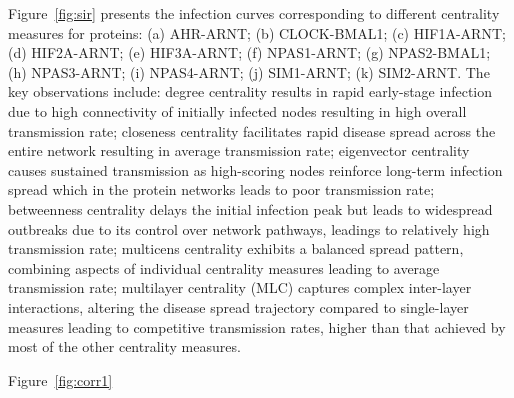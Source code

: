 \documentclass[10pt,letterpaper]{article}
\begin{document}
Figure~\ref{fig:sir} presents the infection curves corresponding to different centrality measures for proteins: (a) AHR-ARNT; (b) CLOCK-BMAL1; (c) HIF1A-ARNT; (d) HIF2A-ARNT; (e) HIF3A-ARNT; (f) NPAS1-ARNT; (g) NPAS2-BMAL1; (h) NPAS3-ARNT; (i) NPAS4-ARNT; (j) SIM1-ARNT; (k) SIM2-ARNT. The key observations include: degree centrality results in rapid early-stage infection due to high connectivity of initially infected nodes resulting in high overall transmission rate; closeness centrality facilitates rapid disease spread across the entire network resulting in average transmission rate; eigenvector centrality causes sustained transmission as high-scoring nodes reinforce long-term infection spread which in the protein networks leads to poor transmission rate; betweenness centrality delays the initial infection peak but leads to widespread outbreaks due to its control over network pathways, leadings to relatively high transmission rate; multicens centrality exhibits a balanced spread pattern, combining aspects of individual centrality measures leading to average transmission rate; multilayer centrality (MLC) captures complex inter-layer interactions, altering the disease spread trajectory compared to single-layer measures leading to competitive transmission rates, higher than that achieved by most of the other centrality measures. 

Figure~\ref{fig:corr1} 
\end{document}
